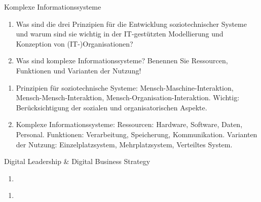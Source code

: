 \documentclass{article}
\begin{document}
\begin{exercise}{Komplexe Informationssysteme}
  \begin{enumerate}
    \item Was sind die drei Prinzipien für die Entwicklung soziotechnischer Systeme und warum sind sie wichtig in der IT-gestützten Modellierung und Konzeption von (IT-)Organisationen?
    \item Was sind komplexe Informationssysteme? Benennen Sie Ressourcen, Funktionen und Varianten der Nutzung!
  \end{enumerate}

  \begin{solution}
    \begin{enumerate}
      \item Prinzipien für soziotechnische Systeme: Mensch-Maschine-Interaktion, Mensch-Mensch-Interaktion, Mensch-Organisation-Interaktion. Wichtig: Berücksichtigung der sozialen und organisatorischen Aspekte.
      \item Komplexe Informationssysteme: Ressourcen: Hardware, Software, Daten, Personal. Funktionen: Verarbeitung, Speicherung, Kommunikation. Varianten der Nutzung: Einzelplatzsystem, Mehrplatzsystem, Verteiltes System.
    \end{enumerate}
  \end{solution}
\end{exercise}

\begin{exercise}{Digital Leadership \& Digital Business Strategy}
  \begin{enumerate}
    \item
  \end{enumerate}

  \begin{solution}
    \begin{enumerate}
      \item
    \end{enumerate}
  \end{solution}
\end{exercise}
\end{document}
